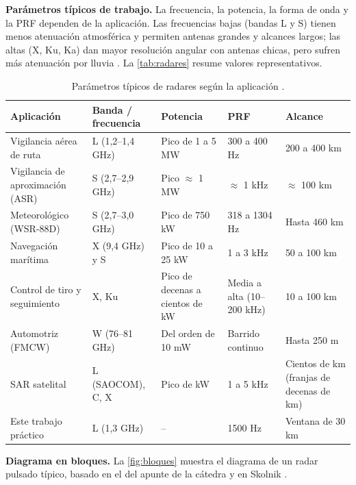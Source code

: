 \textbf{Parámetros típicos de trabajo.} La frecuencia, la potencia, la forma de onda y la PRF dependen de la aplicación. Las frecuencias bajas (bandas L y S) tienen menos atenuación atmosférica y permiten antenas grandes y alcances largos; las altas (X, Ku, Ka) dan mayor resolución angular con antenas chicas, pero sufren más atenuación por lluvia \cite{skolnik, apunte}. La \autoref{tab:radares} resume valores representativos.

\begin{table}[H]
    \centering
    \footnotesize
    \begin{tabular}{|p{3.4cm}|p{2.6cm}|p{2.8cm}|p{2.4cm}|p{3.0cm}|}
        \hline
        \textbf{Aplicación} & \textbf{Banda / frecuencia} & \textbf{Potencia} & \textbf{PRF} & \textbf{Alcance} \\
        \hline
        Vigilancia aérea de ruta & L (1,2--1,4 GHz) & Pico de 1 a 5 MW & 300 a 400 Hz & 200 a 400 km \\
        \hline
        Vigilancia de aproximación (ASR) & S (2,7--2,9 GHz) & Pico $\approx$ 1 MW & $\approx$ 1 kHz & $\approx$ 100 km \\
        \hline
        Meteorológico (WSR-88D) & S (2,7--3,0 GHz) & Pico de 750 kW & 318 a 1304 Hz & Hasta 460 km \\
        \hline
        Navegación marítima & X (9,4 GHz) y S & Pico de 10 a 25 kW & 1 a 3 kHz & 50 a 100 km \\
        \hline
        Control de tiro y seguimiento & X, Ku & Pico de decenas a cientos de kW & Media a alta (10--200 kHz) & 10 a 100 km \\
        \hline
        Automotriz (FMCW) & W (76--81 GHz) & Del orden de 10 mW & Barrido continuo & Hasta 250 m \\
        \hline
        SAR satelital & L (SAOCOM), C, X & Pico de kW & 1 a 5 kHz & Cientos de km (franjas de decenas de km) \\
        \hline
        Este trabajo práctico & L (1,3 GHz) & -- & 1500 Hz & Ventana de 30 km \\
        \hline
    \end{tabular}
    \caption{Parámetros típicos de radares según la aplicación \cite{skolnik, richards}.}
    \label{tab:radares}
\end{table}

\textbf{Diagrama en bloques.} La \autoref{fig:bloques} muestra el diagrama de un radar pulsado típico, basado en el del apunte de la cátedra \cite{apunte} y en Skolnik \cite{skolnik}.


